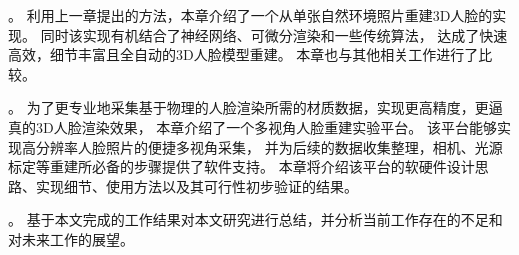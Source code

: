 。
利用上一章提出的方法，本章介绍了一个从单张自然环境照片重建3D人脸的实现。
同时该实现有机结合了神经网络、可微分渲染和一些传统算法，
达成了快速高效，细节丰富且全自动的3D人脸模型重建。
本章也与其他相关工作进行了比较。

。
为了更专业地采集基于物理的人脸渲染所需的材质数据，实现更高精度，更逼真的3D人脸渲染效果，
本章介绍了一个多视角人脸重建实验平台。
该平台能够实现高分辨率人脸照片的便捷多视角采集，
并为后续的数据收集整理，相机、光源标定等重建所必备的步骤提供了软件支持。
本章将介绍该平台的软硬件设计思路、实现细节、使用方法以及其可行性初步验证的结果。

。
基于本文完成的工作结果对本文研究进行总结，并分析当前工作存在的不足和对未来工作的展望。
